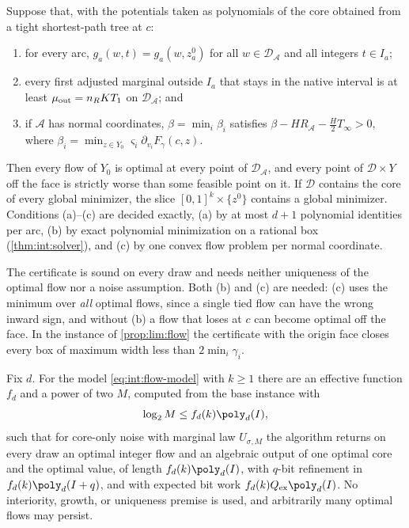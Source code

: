 \begin{theorem}\label{thm:int:face}
Suppose that, with the potentials taken as polynomials of the core obtained
from a tight shortest-path tree at $c$:
\begin{enumerate}[label=(\alph*)]
\item for every arc, $g_a(w,t)=g_a(w,z^0_a)$ for all $w\in\mathcal D_{\mathcal A}$
and all integers $t\in I_a$;
\item every first adjusted marginal outside $I_a$ that stays in the native
interval is at least $\mu_{\rm out}=n_RKT_1$ on $\mathcal D_{\mathcal A}$; and
\item if $\mathcal A$ has normal coordinates, $\beta=\min_i\beta_i$ satisfies
$\beta-HR_{\mathcal A}-\frac H2T_\infty>0$, where
$\beta_i=\min_{z\in Y_0}\varsigma_i\partial_{v_i}F_\gamma(c,z)$.
\end{enumerate}
Then every flow of $Y_0$ is optimal at every point of $\mathcal D_{\mathcal A}$,
and every point of $\mathcal D\times Y$ off the face is strictly worse than some
feasible point on it. If $\mathcal D$ contains the core of every global
minimizer, the slice $[0,1]^k\times\{z^0\}$ contains a global minimizer.
Conditions (a)--(c) are decided exactly, (a) by at most $d+1$ polynomial
identities per arc, (b) by exact polynomial minimization on a rational box
(\cref{thm:int:solver}), and (c) by one convex flow problem per normal
coordinate.
\end{theorem}

The certificate is sound on every draw and needs neither uniqueness of the
optimal flow nor a noise assumption. Both (b) and (c) are needed: (c) uses the
minimum over \emph{all} optimal flows, since a single tied flow can have the
wrong inward sign, and without (b) a flow that loses at $c$ can become optimal
off the face. In the instance of \cref{prop:lim:flow} the certificate with the origin
face closes every box of maximum width less than $2\min_i\gamma_i$.

\begin{theorem}\label{thm:int:flow-boundary}
Fix $d$. For the model \eqref{eq:int:flow-model} with $k\ge1$ there are an
effective function $f_d$ and a power of two $M$, computed from the base
instance with
\[
 \log_2M\le f_d(k)\poly_d(I),
\]
such that for core-only noise with marginal law $U_{\sigma,M}$ the algorithm
returns on every draw an optimal integer flow and an algebraic output of one
optimal core and the optimal value, of length $f_d(k)\poly_d(I)$, with
$q$-bit refinement in $f_d(k)\poly_d(I+q)$, and with expected bit work
$f_d(k)Q_{\rm ex}\poly_d(I)$. No interiority, growth, or uniqueness premise is
used, and arbitrarily many optimal flows may persist.
\end{theorem}

